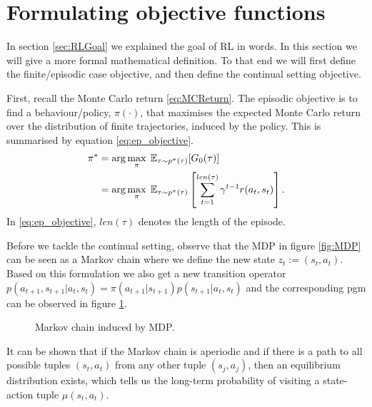 \documentclass{report}
\numberwithin{equation}{section}
\numberwithin{figure}{section}
\numberwithin{table}{section}
\numberwithin{algorithm}{section}
\begin{document}
\section{Formulating objective functions}\label{sec:RLGoalMaths}
In section \ref{sec:RLGoal} we explained the goal of RL in words. 
In this section we will give a more formal mathematical definition. 
To that end we will first define the finite/episodic case objective, 
and then define the continual setting objective.

First, recall the Monte Carlo return \ref{eq:MCReturn}. The episodic 
objective is to find a behaviour/policy, $\pi(\cdot)$, that maximises 
the expected Monte Carlo return over the distribution of finite 
trajectories, induced by the policy. This is summarised by equation \ref{eq:ep_objective}.
\begin{align}
  \label{eq:ep_objective}
  \pi^*&=\arg \max_{\pi}\; \mathbb{E}_{\tau\sim p^{\pi}(\tau)}[G_0(\tau)]\notag\\
  &=\arg \max_{\pi}\; \mathbb{E}_{\tau\sim p^{\pi}(\tau)}\left[\sum_{t=1}^{len(\tau)}\gamma^{t-1}r(a_{t}, s_{t})\right].
\end{align}
In \ref{eq:ep_objective}, $len(\tau)$ denotes the length of the episode.

Before we tackle the continual setting, observe that the MDP in 
figure \ref{fig:MDP} can be seen as a Markov chain where we define 
the new state $z_t:=(s_t, a_t)$. Based on this formulation we also 
get a new transition operator 
$p(a_{t+1},s_{t+1}|a_t,s_t)=\pi(a_{t+1}|s_{t+1})p(s_{t+1}|a_t,s_t)$ and 
the corresponding pgm can be observed in figure \ref{fig:MCz}.

\begin{figure}[H]
  \centering
  \caption{\label{fig:MCz} Markov chain induced by MDP.}
\end{figure}

It can be shown that if the Markov chain is aperiodic and if there 
is a path to all possible tuples $(s_t, a_t)$ from any other tuple 
$(s_j, a_j)$, then an equilibrium distribution exists, which 
tells us the long-term probability of visiting a state-action tuple 
$\mu(s_t, a_t)$.
\end{document}
